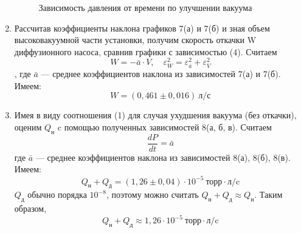 \documentclass[a4paper, 12pt]{article}
\begin{document}
\begin{enumerate}
	\begin{figure}[!h]
		\begin{center}
		\end{center}
		\caption{Зависимость давления от времени по улучшении вакуума}
	\end{figure}
	\item
	Рассчитав коэффициенты наклона графиков 7(а) и 7(б) и зная объем высоковакуумной части установки, получим скорость откачки W диффузионного насоса, сравнив графики с зависимостью (4). Считаем $$W = -\bar{a}\cdot V, \quad\varepsilon_W^2 = \varepsilon_{\bar{a}}^2 + \varepsilon_V^2$$,  где $\bar{a}$ --- среднее коэффициентов наклона из зависимостей 7(а) и 7(б). Имеем:
	$$W = (0,461\pm0,016) ~\text{л/с}$$
	\item
	Имея в виду соотношения (1) для случая ухудшения вакуума (без откачки), оценим $Q_\text{н}$ c помощью полученных зависимостей 8(а, б, в). Считаем $$\frac{dP}{dt} = \bar{a}$$ где $\bar{a}$ --- среднее коэффициентов наклона из зависимостей 8(а), 8(б), 8(в). Имеем:
	$$Q_\text{н} + Q_\text{д} = (1,26\pm0,04)\cdot 10^{-5} ~\text{торр}\cdot\text{л/c}$$
	$Q_\text{д}$ обычно порядка $10^{-8}$, поэтому можно считать $Q_\text{н} + Q_\text{д} \approx Q_\text{н}$. Таким образом,
	$$Q_\text{н} + Q_\text{д} \approx 1,26\cdot 10^{-5} ~\text{торр}\cdot\text{л/c}$$

\end{enumerate}
\end{document}
